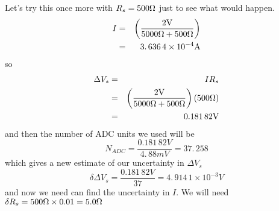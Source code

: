 Let's try this once more with $R_{s}=500\unit{%
\Omega%
}$ just to see what would happen.
\begin{eqnarray*}
I &=&\left( \frac{2\unit{V}}{5000\unit{%
\Omega%
}+500\unit{%
\Omega%
}}\right) \\
&=&3.\,\allowbreak 636\,4\times 10^{-4}\unit{A}
\end{eqnarray*}%
so%
\begin{eqnarray*}
\Delta V_{s} &=&IR_{s} \\
&=&\left( \frac{2\unit{V}}{5000\unit{%
\Omega%
}+500\unit{%
\Omega%
}}\right) \left( 500\unit{%
\Omega%
}\right) \\
&=&0.181\,82\unit{V}
\end{eqnarray*}%
and then the number of ADC units we used will be 
\begin{equation*}
N_{ADC}=\frac{0.181\,82\unit{V}}{4.\,\allowbreak 88\unit{mV}}%
=37.\,\allowbreak 258
\end{equation*}%
which gives a new estimate of our uncertainty in $\Delta V_{s}$ 
\begin{equation*}
\delta \Delta V_{s}=\frac{0.181\,82\unit{V}}{37}=4.\,\allowbreak
914\,1\times 10^{-3}\unit{V}
\end{equation*}%
and now we need can find the uncertainty in $I.$ We will need $\delta
R_{s}=500\unit{%
\Omega%
}\times 0.01=\allowbreak 5.0\unit{%
\Omega%
}$

